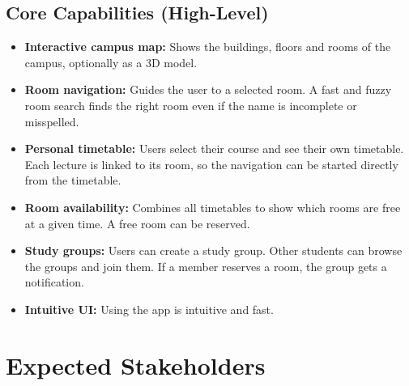\documentclass[11pt, a4paper]{article}
\begin{document}
\subsection*{Core Capabilities (High-Level)}
\begin{itemize}
    \item \textbf{Interactive campus map:} Shows the buildings, floors and rooms of the campus, optionally as a 3D model.
    \item \textbf{Room navigation:} Guides the user to a selected room. A fast and fuzzy
    room search finds the right room even if the name is incomplete or misspelled.
    \item \textbf{Personal timetable:} Users select their course and see their own timetable. Each lecture is linked to its room, so the navigation can be started directly from the timetable.
    \item \textbf{Room availability:} Combines all timetables to show which rooms are free at a given time. A free room can be reserved.
    \item \textbf{Study groups:} Users can create a study group. Other students can browse the groups and join them. If a member reserves a room, the group gets a notification.
    \item \textbf{Intuitive UI:} Using the app is intuitive and fast.
\end{itemize}

\section{Expected Stakeholders}
\end{document}
